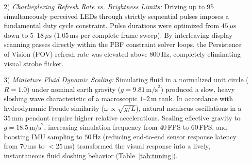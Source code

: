 \documentclass[conference]{IEEEtran}
\begin{document}
2) \emph{Charlieplexing Refresh Rate vs. Brightness Limits:} Driving up to 95 simultaneously perceived LEDs through strictly sequential pulses imposes a fundamental duty cycle constraint. Pulse durations were optimized from $45\,\mu\text{s}$ down to $5\text{--}18\,\mu\text{s}$ ($1.05$\,ms per complete frame sweep). By interleaving display scanning passes directly within the PBF constraint solver loops, the Persistence of Vision (POV) refresh rate was elevated above $800$\,Hz, completely eliminating visual strobe flicker.

3) \emph{Miniature Fluid Dynamic Scaling:} Simulating fluid in a normalized unit circle ($R = 1.0$) under nominal earth gravity ($g = 9.81\,\text{m/s}^2$) produced a slow, heavy sloshing wave characteristic of a macroscopic $1\text{--}2$\,m tank. In accordance with hydrodynamic Froude similarity ($\omega \propto \sqrt{g/L}$), natural meniscus oscillations in a $35$\,mm pendant require higher relative accelerations. Scaling effective gravity to $g = 18.5\,\text{m/s}^2$, increasing simulation frequency from $40$\,FPS to $60$\,FPS, and boosting IMU sampling to $50$\,Hz (reducing end-to-end sensor response latency from $70$\,ms to $<25$\,ms) transformed the visual response into a lively, instantaneous fluid sloshing behavior (Table~\ref{tab:tuning}).

\begin{table}[htbp]
\caption{Dynamic Tuning \& Hardware Optimization on Inherited Platform}
\label{tab:tuning}
\centering
{}
\end{table}
\end{document}
